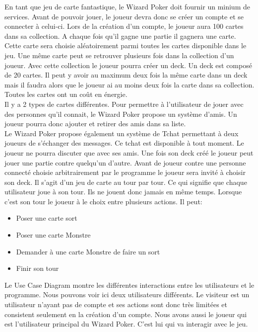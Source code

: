 \documentclass[11pt,a4paper]{article}
\begin{document}
En tant que jeu de carte fantastique, le Wizard Poker doit fournir un minium de services. Avant de pouvoir jouer, le joueur devra donc se créer un compte et se connecter à celui-ci.  Lors de la création d'un compte, le joueur aura 100 cartes dans sa \gls{collection}.  A chaque fois qu'il gagne une partie il gagnera une carte.  Cette carte sera choisie aléatoirement parmi toutes les cartes disponible dans le jeu.  Une même carte peut se retrouver plusieurs fois dans la \gls{collection} d'un joueur.  Avec cette \gls{collection} le joueur pourra créer un \gls{deck}.  Un \gls{deck} est composé de 20 cartes.  Il peut y avoir au maximum deux fois la même carte dans un \gls{deck} mais il faudra alors que le joueur ai au moins deux fois la carte dans sa \gls{collection}.\\
Toutes les cartes ont un coût en énergie.\\ %
Il y a 2 types de cartes différentes.
Pour permettre à l'utilisateur de jouer avec des personnes qu'il connait, le Wizard Poker propose un système d'amis.  Un joueur pourra donc ajouter et retirer des amis dans sa liste.\\
Le Wizard Poker propose également un système de Tchat permettant à deux joueurs de s'échanger des messages.  Ce tchat est disponible à tout moment.  Le joueur ne pourra discuter que avec ses amis.
Une fois son \gls{deck} créé le joueur peut jouer une partie contre quelqu'un d'autre.  Avant de joueur contre une personne connecté choisie arbitrairement par le programme le joueur sera invité à choisir son \gls{deck}.  Il s'agit d'un jeu de carte au tour par tour.  Ce qui signifie que chaque utilisateur joue à son tour.  Ils ne jouent donc jamais en même temps.  Lorsque c'est son tour le joueur à le choix entre plusieurs actions. Il peut:
\begin{itemize}
 \item[\textbullet] Poser une carte sort
 \item[\textbullet] Poser une carte Monstre
 \item[\textbullet] Demander à une carte Monstre de faire un sort
 \item[\textbullet] Finir son tour
\end{itemize}


Le Use Case Diagram montre les différentes interactions entre les
utilisateurs et le programme.  Nous pouvons voir ici deux utilisateurs
différents.  Le visiteur est un utilisateur n'ayant pas de compte et ses
actions sont donc très limitées et consistent seulement en la création d'un compte.
Nous avons aussi le joueur qui est l'utilisateur principal du Wizard Poker.
C'est lui qui va interagir avec le jeu.
\end{document}
